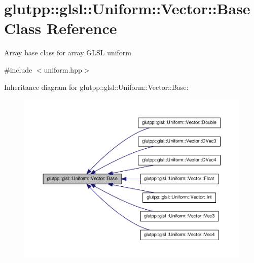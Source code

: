 \hypertarget{classglutpp_1_1glsl_1_1Uniform_1_1Vector_1_1Base}{\section{glutpp\-:\-:glsl\-:\-:\-Uniform\-:\-:\-Vector\-:\-:\-Base \-Class \-Reference}
\label{classglutpp_1_1glsl_1_1Uniform_1_1Vector_1_1Base}
}


\-Array base class for array \-G\-L\-S\-L uniform  




{\ttfamily \#include $<$uniform.\-hpp$>$}



\-Inheritance diagram for glutpp\-:\-:glsl\-:\-:\-Uniform\-:\-:\-Vector\-:\-:\-Base\-:\nopagebreak
\begin{figure}[H]
\begin{center}
\leavevmode
\includegraphics[width=350pt]{classglutpp_1_1glsl_1_1Uniform_1_1Vector_1_1Base__inherit__graph}
\end{center}
\end{figure}
